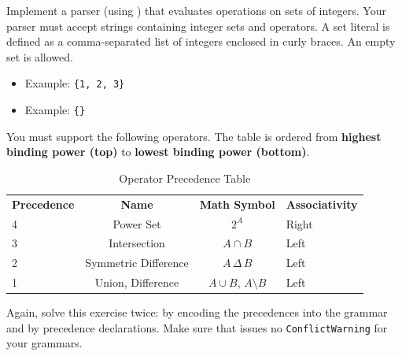 \exerciseEng
Implement a parser (using ) that evaluates operations on sets of integers.
Your parser must accept strings containing integer sets and operators.
A set literal is defined as a comma-separated list of integers enclosed in curly braces.
An empty set is allowed.
\begin{itemize}
    \item Example: \texttt{\{1, 2, 3\}}
    \item Example: \texttt{\{\}}
\end{itemize}
You must support the following operators. The table is ordered from \textbf{highest binding power (top)} to \textbf{lowest binding power (bottom)}.

\begin{table}[h]
\centering
\begin{tabular}{lccl}

  \textbf{Precedence} & \textbf{Name} & \textbf{Math Symbol} & \textbf{Associativity} \\ 
4 & Power Set    &  $2^A$ & Right \\
3 & Intersection &  $A \cap B$ & Left \\
2 & Symmetric Difference & $A \,\Delta\, B$ & Left \\
1 & Union, Difference   & $A \cup B$, $A \setminus B$ & Left \\ 
\end{tabular}
\caption{Operator Precedence Table}
\label{tab:set_ops}
\end{table}

\noindent
Again, solve this exercise twice:  by encoding the precedences into the grammar and by precedence declarations.
Make sure that  issues no \texttt{ConflictWarning} for your grammars.

